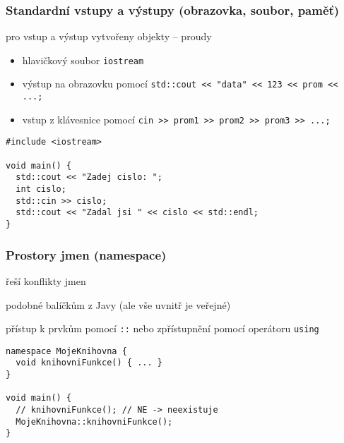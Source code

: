 

\begin{frame}[fragile]
\frametitle{Standardní vstupy a výstupy (obrazovka, soubor, paměť)}

\begin{bitemize}
\item pro vstup a výstup vytvořeny objekty -- proudy
\begin{itemize}
\item hlavičkový soubor \lstinline|iostream|
\item výstup na obrazovku pomocí \lstinline|std::cout << "data" << 123 << prom << ...;|
\item vstup z klávesnice pomocí \lstinline|cin >> prom1 >> prom2 >> prom3 >> ...;|
\end{itemize}
\end{bitemize}

\begin{yesblock}
\begin{lstlisting}[basicstyle=\small]
#include <iostream>

void main() {
  std::cout << "Zadej cislo: ";
  int cislo;
  std::cin >> cislo;
  std::cout << "Zadal jsi " << cislo << std::endl;
}
\end{lstlisting}
\end{yesblock}
\end{frame}



\begin{frame}[fragile]
\frametitle{Prostory jmen (namespace)}
\begin{bitemize}
\item řeší konflikty jmen
\item podobné balíčkům z Javy (ale vše uvnitř je veřejné)
\item přístup k prvkům pomocí \lstinline|::| nebo zpřístupnění pomocí operátoru \lstinline|using|
\end{bitemize}

\begin{yesblock}
\begin{lstlisting}
namespace MojeKnihovna {
  void knihovniFunkce() { ... }
}

void main() {
  // knihovniFunkce(); // NE -> neexistuje
  MojeKnihovna::knihovniFunkce();
}
\end{lstlisting}
\end{yesblock}
\end{frame}



